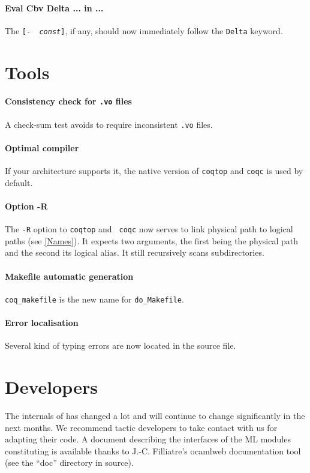 \documentclass[11pt]{article}
\begin{document}
\paragraph{Eval Cbv Delta ... in ...} The {\tt [- {\it
const}]}, if any, should now immediately follow the {\tt Delta} keyword.


\section{Tools}
\label{Tools}

\paragraph{Consistency check for {\tt .vo} files} A check-sum test
avoids to require inconsistent {\tt .vo} files.

\paragraph{Optimal compiler} If your architecture supports it, the native
version of {\tt coqtop} and {\tt coqc} is used by default.

\paragraph{Option -R} The {\tt -R} option to {\tt coqtop} and {\tt
coqc} now serves to link physical path to logical paths (see
\ref{Names}). It expects two arguments, the first being the physical
path and the second its logical alias. It still recursively scans
subdirectories.

\paragraph{Makefile automatic generation} {\tt coq\_makefile} is the
new name for {\tt do\_Makefile}.

\paragraph{Error localisation} Several kind of typing errors are now
located in the source file.

\section{Developers}
\label{Developers}
The internals of {\Coq} has changed a lot and will continue to change
significantly in the next months. We recommend tactic developers to
take contact with us for adapting their code. A document describing
the interfaces of the ML modules constituting {\Coq} is available
thanks to J.-C. Filliatre's ocamlweb
documentation tool (see the ``doc'' directory in {\Coq} source).
\end{document}
